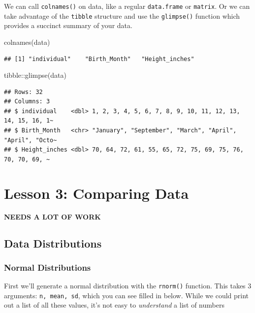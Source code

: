 \documentclass[
]{book}
\newenvironment{Shaded}{\begin{snugshade}}{\end{snugshade}}
\newcommand{\FunctionTok}[1]{\textcolor[rgb]{0.00,0.00,0.00}{#1}}
\newcommand{\NormalTok}[1]{#1}
\newcommand{\SpecialCharTok}[1]{\textcolor[rgb]{0.00,0.00,0.00}{#1}}
\begin{document}
We can call \texttt{colnames()} on data, like a regular \texttt{data.frame} or \texttt{matrix}. Or we can take advantage of the \texttt{tibble} structure and use the \texttt{glimpse()} function which provides a succinct summary of your data.

\begin{Shaded}
\begin{Highlighting}[]
\FunctionTok{colnames}\NormalTok{(data)}
\end{Highlighting}
\end{Shaded}

\begin{verbatim}
## [1] "individual"    "Birth_Month"   "Height_inches"
\end{verbatim}

\begin{Shaded}
\begin{Highlighting}[]
\NormalTok{tibble}\SpecialCharTok{::}\FunctionTok{glimpse}\NormalTok{(data)}
\end{Highlighting}
\end{Shaded}

\begin{verbatim}
## Rows: 32
## Columns: 3
## $ individual    <dbl> 1, 2, 3, 4, 5, 6, 7, 8, 9, 10, 11, 12, 13, 14, 15, 16, 1~
## $ Birth_Month   <chr> "January", "September", "March", "April", "April", "Octo~
## $ Height_inches <dbl> 70, 64, 72, 61, 55, 65, 72, 75, 69, 75, 76, 70, 70, 69, ~
\end{verbatim}

\hypertarget{lesson-3-comparing-data-1}{%
\chapter{Lesson 3: Comparing Data}\label{lesson-3-comparing-data-1}}

\textbf{NEEDS A LOT OF WORK}

\hypertarget{data-distributions}{%
\section{Data Distributions}\label{data-distributions}}

\hypertarget{normal-distributions}{%
\subsection{Normal Distributions}\label{normal-distributions}}

First we'll generate a normal distribution with the \texttt{rnorm()} function. This takes 3 arguments: \texttt{n,\ mean,\ sd}, which you can see filled in below. While we could print out a list of all these values, it's not easy to \emph{understand} a list of numbers
\end{document}
